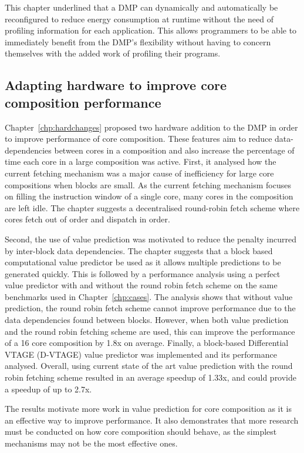 This chapter underlined that a DMP can dynamically and automatically be reconfigured to reduce energy consumption at runtime without the need of profiling information for each application.
This allows programmers to be able to immediately benefit from the DMP's flexibility without having to concern themselves with the added work of profiling their programs.


\subsection{Adapting hardware to improve core composition performance}
Chapter~\ref{chp:hardchanges} proposed two hardware addition to the DMP in order to improve performance of core composition.
These features aim to reduce data-dependencies between cores in a composition and also increase the percentage of time each core in a large composition was active.
First, it analysed how the current fetching mechanism was a major cause of inefficiency for large core compositions when blocks are small.
As the current fetching mechanism focuses on filling the instruction window of a single core, many cores in the composition are left idle.
The chapter suggests a decentralised round-robin fetch scheme where cores fetch out of order and dispatch in order.

Second, the use of value prediction was motivated to reduce the penalty incurred by inter-block data dependencies.
The chapter suggests that a block based computational value predictor be used as it allows multiple predictions to be generated quickly.
This is followed by a performance analysis using a perfect value predictor with and without the round robin fetch scheme on the same benchmarks used in Chapter~\ref{chp:cases}.
The analysis shows that without value prediction, the round robin fetch scheme cannot improve performance due to the data dependencies found between blocks.
However, when both value prediction and the round robin fetching scheme are used, this can improve the performance of a 16 core composition by 1.8x on average.
Finally, a block-based Differential VTAGE (D-VTAGE) value predictor was implemented and its performance analysed.
Overall, using current state of the art value prediction with the round robin fetching scheme resulted in an average speedup of 1.33x, and could provide a speedup of up to 2.7x.

The results motivate more work in value prediction for core composition as it is an effective way to improve performance.
It also demonstrates that more research must be conducted on how core composition should behave, as the simplest mechanisms may not be the most effective ones.

